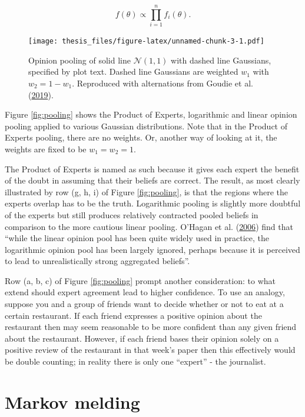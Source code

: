 \documentclass[11pt,]{book}
\begin{document}
\begin{equation}
f(\theta) \propto \prod_{i=1}^{n} f_i(\theta). \label{eq:poe}
\end{equation}

\begin{figure}
\centering
\texttt{[image: thesis\_files/figure-latex/unnamed-chunk-3-1.pdf]}
\caption{\label{fig:unnamed-chunk-3}Opinion pooling of solid line
\(\mathcal{N}(1, 1)\) with dashed line Gaussians, specified by plot
text. Dashed line Gaussians are weighted \(w_1\) with \(w_2 = 1 - w_1\).
Reproduced with alternations from Goudie et al.
(\protect\hyperlink{ref-goudie2019joining}{2019}). \label{fig:pooling}}
\end{figure}

Figure \eqref{fig:pooling} shows the Product of Experts, logarithmic and
linear opinion pooling applied to various Gaussian distributions. Note
that in the Product of Experts pooling, there are no weights. Or,
another way of looking at it, the weights are fixed to be
\(w_1 = w_2 = 1\).

The Product of Experts is named as such because it gives each expert the
benefit of the doubt in assuming that their beliefs are correct. The
result, as most clearly illustrated by row (g, h, i) of Figure
\eqref{fig:pooling}, is that the regions where the experts overlap has
to be the truth. Logarithmic pooling is slightly more doubtful of the
experts but still produces relatively contracted pooled beliefs in
comparison to the more cautious linear pooling. O'Hagan et al.
(\protect\hyperlink{ref-o2006uncertain}{2006}) find that ``while the
linear opinion pool has been quite widely used in practice, the
logarithmic opinion pool has been largely ignored, perhaps because it is
perceived to lead to unrealistically strong aggregated beliefs''.

Row (a, b, c) of Figure \eqref{fig:pooling} prompt another
consideration: to what extend should expert agreement lead to higher
confidence. To use an analogy, suppose you and a group of friends want
to decide whether or not to eat at a certain restaurant. If each friend
expresses a positive opinion about the restaurant then may seem
reasonable to be more confident than any given friend about the
restaurant. However, if each friend bases their opinion solely on a
positive review of the restaurant in that week's paper then this
effectively would be double counting; in reality there is only one
``expert'' - the journalist.

\section{Markov melding}\label{markov-melding}
\end{document}
